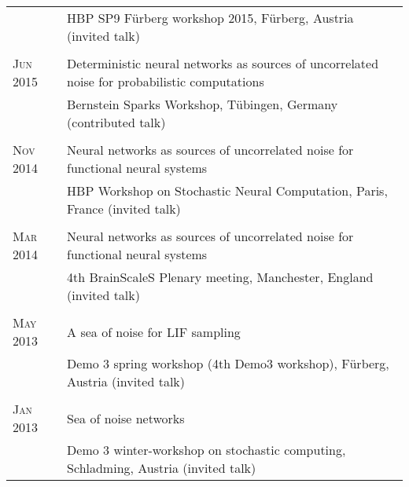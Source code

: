 \begin{longtable}{>{\hfill}p{1.6cm}|p{}}
  & \footnotesize HBP SP9 F\"urberg workshop 2015, F\"urberg, Austria (invited talk) \\
  \multicolumn{2}{c}{} \\
  \textsc{Jun} 2015 & Deterministic neural networks as sources of uncorrelated noise for probabilistic computations \\
  & \footnotesize Bernstein Sparks Workshop, T\"ubingen, Germany (contributed talk)\\
  \multicolumn{2}{c}{} \\
  \textsc{Nov} 2014 & Neural networks as sources of uncorrelated noise for functional neural systems \\
  & \footnotesize HBP Workshop on Stochastic Neural Computation, Paris, France (invited talk)\\
  \multicolumn{2}{c}{} \\
  \textsc{Mar} 2014 & Neural networks as sources of uncorrelated noise for functional neural systems \\
  & \footnotesize 4th BrainScaleS Plenary meeting, Manchester, England  (invited talk)\\
  \multicolumn{2}{c}{} \\
  \textsc{May} 2013 & A sea of noise for LIF sampling \\
  & \footnotesize Demo 3 spring workshop (4th Demo3 workshop), F\"urberg, Austria  (invited talk)\\
  \multicolumn{2}{c}{} \\
  \textsc{Jan} 2013 & Sea of noise networks \\
  & \footnotesize Demo 3 winter-workshop on stochastic computing, Schladming, Austria (invited talk)\\
\end{longtable}
